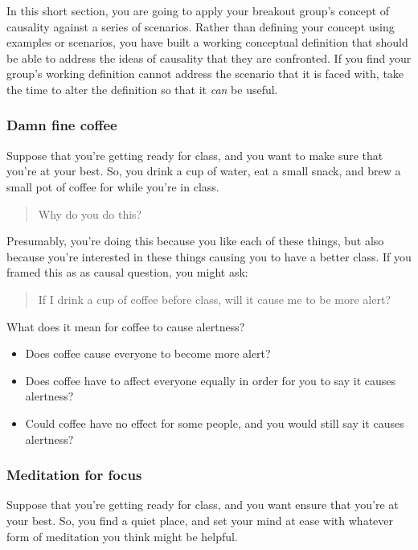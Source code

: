 \documentclass[
]{article}
\providecommand{\tightlist}{%
  \setlength{\itemsep}{0pt}\setlength{\parskip}{0pt}}
\theoremstyle{definition}
\theoremstyle{definition}
\theoremstyle{definition}
\theoremstyle{definition}
\theoremstyle{remark}
\begin{document}
In this short section, you are going to apply your breakout group's concept of causality against a series of scenarios. Rather than defining your concept using examples or scenarios, you have built a working conceptual definition that should be able to address the ideas of causality that they are confronted. If you find your group's working definition cannot address the scenario that it is faced with, take the time to alter the definition so that it \emph{can} be useful.

\subsubsection{Damn fine coffee}\label{damn-fine-coffee}

Suppose that you're getting ready for class, and you want to make sure that you're at your best. So, you drink a cup of water, eat a small snack, and brew a small pot of coffee for while you're in class.

\begin{quote}
Why do you do this?
\end{quote}

Presumably, you're doing this because you like each of these things, but also because you're interested in these things causing you to have a better class. If you framed this as as causal question, you might ask:

\begin{quote}
If I drink a cup of coffee before class, will it cause me to be more alert?
\end{quote}

What does it mean for coffee to cause alertness?

\begin{itemize}
\tightlist
\item
  Does coffee cause everyone to become more alert?
\item
  Does coffee have to affect everyone equally in order for you to say it causes alertness?
\item
  Could coffee have no effect for some people, and you would still say it causes alertness?
\end{itemize}

\subsubsection{Meditation for focus}\label{meditation-for-focus}

Suppose that you're getting ready for class, and you want ensure that you're at your best. So, you find a quiet place, and set your mind at ease with whatever form of meditation you think might be helpful.
\end{document}
